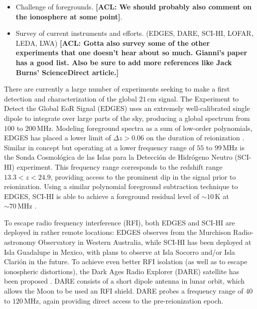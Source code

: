 \documentclass[twolcolumn,apj,iop,numberedappendix]{emulateapj}
\newcommand{\acl}[1]{{\color{red} \textbf{[ACL:  #1]}}}
\begin{document}
\begin{itemize}
\item Challenge of foregrounds.  \acl{We should probably also comment on the ionosphere at some point}.
\item Survey of current instruments and efforts. (EDGES, DARE, SCI-HI, LOFAR, LEDA, LWA) \acl{Gotta also survey some of the other experiments that one doesn't hear about so much.  Gianni's paper has a good list.  Also be sure to add more references like Jack Burns' ScienceDirect article.}
\end{itemize}
There are currently a large number of experiments seeking to make a first detection and characterization of the global $21\,\textrm{cm}$ signal.  The Experiment to Detect the Global EoR Signal (EDGES) uses an extremely well-calibrated single dipole \citep{rogersCalib} to integrate over large parts of the sky, producing a global spectrum from $100$ to $200\,\textrm{MHz}$.  Modeling foreground spectra as a sum of low-order polynomials, EDGES has placed a lower limit of $\Delta z > 0.06$ on the duration of reionization \citep{bowmanRogersMeasurement}.  Similar in concept but operating at a lower frequency range of $55$ to $99\,\textrm{MHz}$ is the Sonda Cosmol\'{o}gica de las Islas para la Detecci\'{o}n de Hidr\'{o}geno Neutro (SCI-HI) experiment.  This frequency range corresponds to the redshift range $13.3 < z < 24.9$, providing access to the prominent dip in the signal prior to reionization.  Using a similar polynomial foreground subtraction technique to EDGES, SCI-HI is able to achieve a foreground residual level of $\sim 10\,\textrm{K}$ at $\sim 70 \,\textrm{MHz}$ \citep{voytekSCIHI}.

To escape radio frequency interference (RFI), both EDGES and SCI-HI are deployed in rather remote locations: EDGES observes from the Murchison Radio-astronomy Observatory in Western Australia, while SCI-HI has been deployed at Isla Guadalupe in Mexico, with plans to observe at Isla Socorro and/or Isla Clari\'{o}n in the future.  To achieve even better RFI isolation (as well as to escape ionospheric distortions), the Dark Ages Radio Explorer (DARE) satellite has been proposed \citep{DAREMCMC}.  DARE consists of a short dipole antenna in lunar orbit, which allows the Moon to be used an RFI shield.  DARE probes a frequency range of $40$ to $120\,\textrm{MHz}$, again providing direct access to the pre-reionization epoch.
\end{document}

